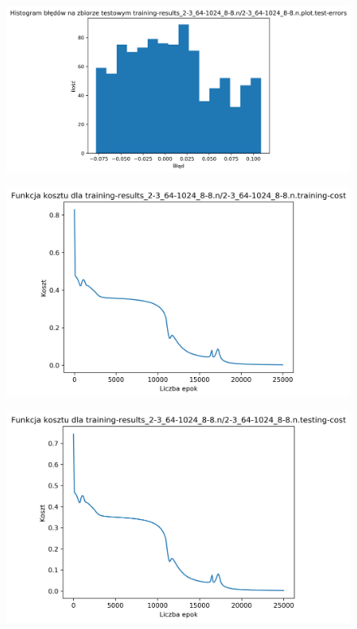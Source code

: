 \documentclass{classrep}
\begin{document}
{{\begin{figure}[!htbp]
            \end{figure}
            \begin{figure}[!htbp]
                \centering
                \includegraphics[width=140mm]{wykresy/2-3_64-1024_8-8_n_plot_test-errors.png}
            \end{figure}
            \begin{figure}[!htbp]
                \centering
                \includegraphics[width=120mm]{wykresy/2-3_64-1024_8-8_n_training-cost.png}
            \end{figure}
            \begin{figure}[!htbp]
                \centering
                \includegraphics[width=120mm]{wykresy/2-3_64-1024_8-8_n_testing-cost.png}

\end{figure}}}
\end{document}
